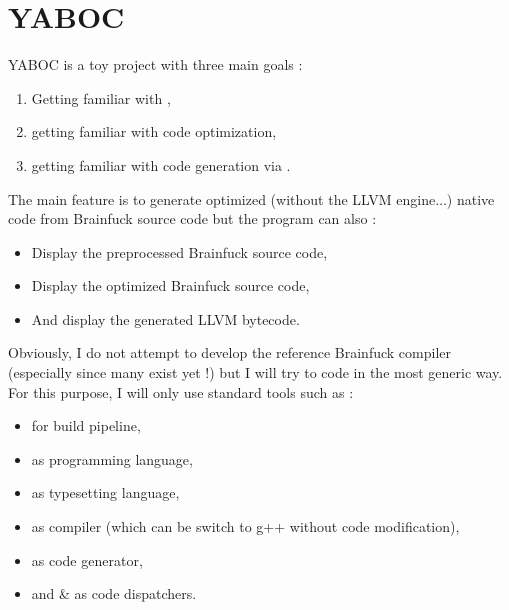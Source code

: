 \section{YABOC}%
\gls{YABOC} is a toy project with three main goals :
\begin{enumerate}
        \item Getting familiar with ,
        \item getting familiar with code optimization,
        \item getting familiar with code generation via .
\end{enumerate}

The main feature is to generate optimized (without the LLVM engine$\ldots$) native code from Brainfuck source code but the program can also :
\begin{itemize}
        \item Display the preprocessed Brainfuck source code,
        \item Display the optimized Brainfuck source code,
        \item And display the generated LLVM bytecode.
\end{itemize}

\newpar Obviously, I do not attempt to develop the reference Brainfuck compiler (especially since many exist yet !) but I will try to code in the most generic way. For this purpose, I will only use standard tools such as :
\begin{itemize}
        \item {} for build pipeline,
        \item {} as programming language,
        \item \tbf{\LaTeX} as typesetting language,
        \item {} as compiler (which can be switch to g++ without code modification),
        \item {} as code generator,
        \item and  \&  as code dispatchers.
\end{itemize}

